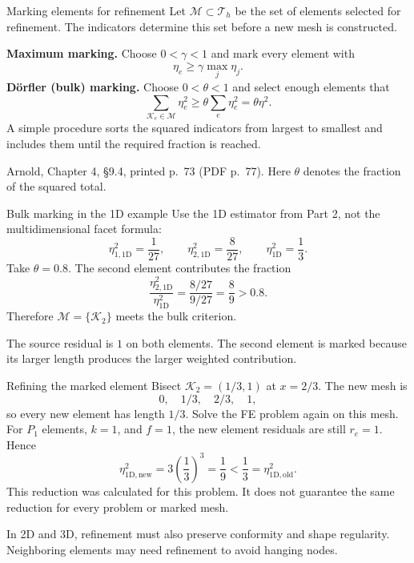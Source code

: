 \documentclass[11pt,aspectratio=169]{beamer}
\newcommand{\Th}{\mathcal T_h}
\begin{document}
\begin{frame}{Marking elements for refinement}
Let $\mathcal M\subset\Th$ be the set of elements selected for refinement.
The indicators determine this set before a new mesh is constructed.

\textbf{Maximum marking.} Choose $0<\gamma<1$ and mark every element with
\[
 \eta_e\geq\gamma\max_j\eta_j.
\]
\textbf{D\"orfler (bulk) marking.} Choose $0<\theta<1$ and select enough
elements that
\[
 \boxed{\sum_{\mathcal K_e\in\mathcal M}\eta_e^2
 \geq\theta\sum_e\eta_e^2=\theta\eta^2.}
\]
A simple procedure sorts the squared indicators from largest to smallest
and includes them until the required fraction is reached.

\vspace{0.12cm}
{\footnotesize Arnold, Chapter 4, \S9.4, printed p.~73 (PDF p.~77).
Here $\theta$ denotes the fraction of the squared total.}
\end{frame}

\begin{frame}{Bulk marking in the 1D example}
Use the 1D estimator from Part 2, not the multidimensional facet formula:
\[
 \eta_{1,\mathrm{1D}}^2=\frac1{27},\qquad
 \eta_{2,\mathrm{1D}}^2=\frac8{27},\qquad
 \eta_{\mathrm{1D}}^2=\frac13.
\]
Take $\theta=0.8$. The second element contributes the fraction
\[
 \frac{\eta_{2,\mathrm{1D}}^2}{\eta_{\mathrm{1D}}^2}
 =\frac{8/27}{9/27}=\frac89>0.8.
\]
Therefore $\mathcal M=\{\mathcal K_2\}$ meets the bulk criterion.

The source residual is $1$ on both elements. The second element is marked
because its larger length produces the larger weighted contribution.
\end{frame}

\begin{frame}{Refining the marked element}
Bisect $\mathcal K_2=(1/3,1)$ at $x=2/3$. The new mesh is
\[
 0,\quad 1/3,\quad 2/3,\quad 1,
\]
so every new element has length $1/3$.
Solve the FE problem again on this mesh. For $P_1$ elements, $k=1$, and
$f=1$, the new element residuals are still $r_e=1$. Hence
\[
 \eta_{\mathrm{1D,new}}^2
 =3\left(\frac13\right)^3=\frac19
 <\frac13=\eta_{\mathrm{1D,old}}^2.
\]
This reduction was calculated for this problem. It does not guarantee the
same reduction for every problem or marked mesh.

In 2D and 3D, refinement must also preserve conformity and shape regularity.
Neighboring elements may need refinement to avoid hanging nodes.
\end{frame}
\end{document}
